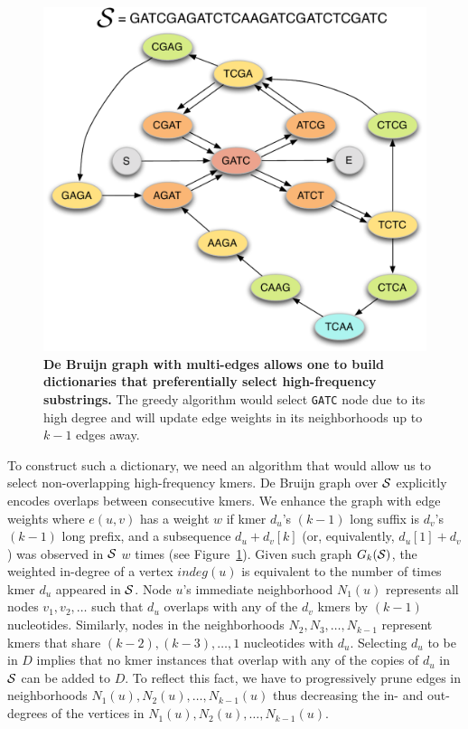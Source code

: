 \documentclass[12pt]{cmuthesis}
\begin{document}
  \begin{figure}[ht]
    \centering
    \includegraphics[width=0.7\linewidth]{figures/huffmer_node_neighborhoods}
    \caption{\textbf{De Bruijn graph with multi-edges allows one to build dictionaries that preferentially select high-frequency substrings.} The greedy algorithm would select \texttt{GATC} node due to its high degree and will update edge weights in its neighborhoods up to $k-1$ edges away.}
    \label{fig:denovo:debruijn}
  \end{figure}

  To construct such a dictionary, we need an algorithm that would allow us to select non-overlapping high-frequency kmers. De Bruijn graph over $\mathcal{S}$ explicitly encodes overlaps between consecutive kmers. We enhance the graph with edge weights where $e(u,v)$ has a weight $w$ if kmer $d_u$'s $(k-1)$ long suffix is $d_v$'s $(k-1)$ long prefix, and a subsequence $d_u + d_v[k]$ (or, equivalently, $d_u[1] + d_v$) was observed in $\mathcal{S}$ $w$ times (see Figure~\ref{fig:denovo:debruijn}). Given such graph $G_k(\mathcal{S})$, the weighted in-degree of a vertex $indeg(u)$ is equivalent to the number of times kmer $d_u$ appeared in $\mathcal{S}$. Node $u$'s immediate neighborhood $N_1(u)$ represents all nodes $v_1, v_2, \ldots$ such that $d_u$ overlaps with any of the $d_v$ kmers by $(k-1)$ nucleotides. Similarly, nodes in the neighborhoods $N_2, N_3, \ldots, N_{k-1}$ represent kmers that share $(k-2), (k-3), \ldots, 1$ nucleotides with $d_u$. Selecting $d_u$ to be in $D$ implies that no kmer instances that overlap with any of the copies of $d_u$ in $\mathcal{S}$ can be added to $D$. To reflect this fact, we have to progressively prune edges in neighborhoods $N_1(u), N_2(u), \ldots, N_{k-1}(u)$ thus decreasing the in- and out-degrees of the vertices in $N_1(u), N_2(u), \ldots, N_{k-1}(u)$. 
\end{document}
